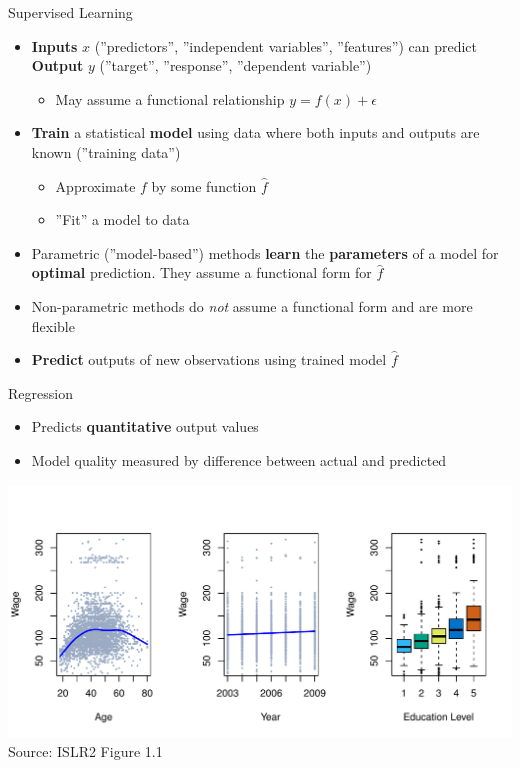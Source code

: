 \documentclass[ignorenonframetext,xcolor=x11names]{beamer}
\begin{document}
\begin{frame}{Supervised Learning}
\begin{itemize}
  \item \textbf{Inputs} $x$ (''predictors'', ''independent variables'', ''features'') can predict \textbf{Output} $y$ (''target'', ''response'', ''dependent variable'')
  \begin{itemize}
  \item May assume a functional relationship $y = f(x) + \epsilon$
  \end{itemize}
  \item \textbf{Train} a statistical \textbf{model} using data where both inputs and outputs are known (''training data'')
  \begin{itemize}
  \item Approximate $f$ by some function $\hat{f}$
  \item ''Fit'' a model to data
  \end{itemize}
  \item Parametric (''model-based'') methods \textbf{learn} the \textbf{parameters} of a model for \textbf{optimal} prediction. They assume a functional form for $\hat{f}$
  \item Non-parametric methods do \emph{not} assume a functional form and are more flexible
  \item \textbf{Predict} outputs of new observations using trained model $\hat{f}$
\end{itemize}
\end{frame}


\begin{frame}{Regression}
  \begin{itemize}
    \item Predicts \textbf{quantitative} output values
    \item Model quality measured by difference between actual and predicted
  \end{itemize}
\centering
\vspace{5mm}
\includegraphics[width=\textwidth]{Figures_Chapters_1-6/Chapter1/1_1.pdf} \\
\scriptsize Source: ISLR2 Figure 1.1
\end{frame}
\end{document}
